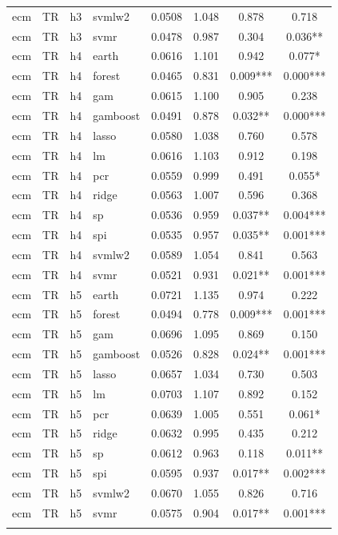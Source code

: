 \begin{ThreePartTable}
\begin{longtable}[t]{llclcccc}
ecm & TR & h3 & svmlw2 & 0.0508 & 1.048 & 0.878 & 0.718\\
ecm & TR & h3 & svmr & 0.0478 & 0.987 & 0.304 & 0.036**\\
\addlinespace
ecm & TR & h4 & earth & 0.0616 & 1.101 & 0.942 & 0.077*\\
ecm & TR & h4 & forest & 0.0465 & 0.831 & 0.009*** & 0.000***\\
ecm & TR & h4 & gam & 0.0615 & 1.100 & 0.905 & 0.238\\
ecm & TR & h4 & gamboost & 0.0491 & 0.878 & 0.032** & 0.000***\\
ecm & TR & h4 & lasso & 0.0580 & 1.038 & 0.760 & 0.578\\
ecm & TR & h4 & lm & 0.0616 & 1.103 & 0.912 & 0.198\\
ecm & TR & h4 & pcr & 0.0559 & 0.999 & 0.491 & 0.055*\\
ecm & TR & h4 & ridge & 0.0563 & 1.007 & 0.596 & 0.368\\
ecm & TR & h4 & sp & 0.0536 & 0.959 & 0.037** & 0.004***\\
ecm & TR & h4 & spi & 0.0535 & 0.957 & 0.035** & 0.001***\\
ecm & TR & h4 & svmlw2 & 0.0589 & 1.054 & 0.841 & 0.563\\
ecm & TR & h4 & svmr & 0.0521 & 0.931 & 0.021** & 0.001***\\
\addlinespace
ecm & TR & h5 & earth & 0.0721 & 1.135 & 0.974 & 0.222\\
ecm & TR & h5 & forest & 0.0494 & 0.778 & 0.009*** & 0.001***\\
ecm & TR & h5 & gam & 0.0696 & 1.095 & 0.869 & 0.150\\
ecm & TR & h5 & gamboost & 0.0526 & 0.828 & 0.024** & 0.001***\\
ecm & TR & h5 & lasso & 0.0657 & 1.034 & 0.730 & 0.503\\
ecm & TR & h5 & lm & 0.0703 & 1.107 & 0.892 & 0.152\\
ecm & TR & h5 & pcr & 0.0639 & 1.005 & 0.551 & 0.061*\\
ecm & TR & h5 & ridge & 0.0632 & 0.995 & 0.435 & 0.212\\
ecm & TR & h5 & sp & 0.0612 & 0.963 & 0.118 & 0.011**\\
ecm & TR & h5 & spi & 0.0595 & 0.937 & 0.017** & 0.002***\\
ecm & TR & h5 & svmlw2 & 0.0670 & 1.055 & 0.826 & 0.716\\
ecm & TR & h5 & svmr & 0.0575 & 0.904 & 0.017** & 0.001***\\
\addlinespace

\end{longtable}
\end{ThreePartTable}
